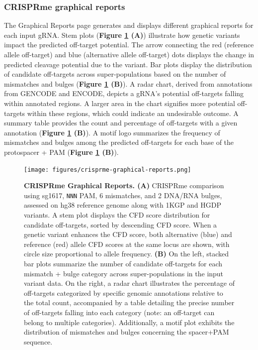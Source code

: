 \documentclass[a4paper, titlepage, openright]{book}
\newcommand{\crisprme}{CRISPRme\xspace}
\begin{document}
\subsubsection{\crisprme graphical reports}
The Graphical Reports page generates and displays different graphical reports for each input gRNA. Stem plots (\textbf{Figure \ref{fig:crisprme-graphical-reports} (A)}) illustrate how genetic variants impact the predicted off-target potential. The arrow connecting the red (reference allele off-target) and blue (alternative allele off-target) dots displays the change in predicted cleavage potential due to the variant. Bar plots display the distribution of candidate off-targets across super-populations based on the number of mismatches and bulges (\textbf{Figure \ref{fig:crisprme-graphical-reports} (B)}). A radar chart, derived from annotations from GENCODE and ENCODE, depicts a gRNA's potential off-targets falling within annotated regions. A larger area in the chart signifies more potential off-targets within these regions, which could indicate an undesirable outcome. A summary table provides the count and percentage of off-targets with a given annotation (\textbf{Figure \ref{fig:crisprme-graphical-reports} (B)}). A motif logo summarizes the frequency of mismatches and bulges among the predicted off-targets for each base of the protospacer + PAM (\textbf{Figure \ref{fig:crisprme-graphical-reports} (B)}).

\begin{figure}[!]
    \centering
    \texttt{[image: figures/crisprme-graphical-reports.png]}
    \caption[\crisprme Graphical Reports]{\textbf{\crisprme Graphical Reports. (A)} CRISPRme comparison using sg1617, \texttt{NNN} PAM, 6 mismatches, and 2 DNA/RNA bulges, assessed on hg38 reference genome along with 1KGP and HGDP variants. A stem plot displays the CFD score distribution for candidate off-targets, sorted by descending CFD score. When a genetic variant enhances the CFD score, both alternative (blue) and reference (red) allele CFD scores at the same locus are shown, with circle size proportional to allele frequency. \textbf{(B)} On the left, stacked bar plots summarize the number of candidate off-targets for each mismatch + bulge category across super-populations in the input variant data. On the right, a radar chart illustrates the percentage of off-targets categorized by specific genomic annotations relative to the total count, accompanied by a table detailing the precise number of off-targets falling into each category (note: an off-target can belong to multiple categories). Additionally, a motif plot exhibits the distribution of mismatches and bulges concerning the spacer+PAM sequence.}
    \label{fig:crisprme-graphical-reports}
\end{figure}
\end{document}
